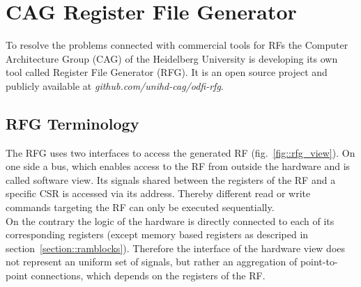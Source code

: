 \section{CAG Register File Generator}
To resolve the problems connected with commercial tools for RFs the Computer Architecture Group (CAG) of the Heidelberg University is developing its own tool called Register File Generator (RFG). It is an open source project and publicly available at \emph{github.com/unihd-cag/odfi-rfg}.

\subsection{RFG Terminology}

The RFG uses two interfaces to access the generated RF (fig.~\ref{fig::rfg_view}). On one side a bus, which enables access to the RF from outside the hardware and is called software view. Its signals shared between the registers of the RF and a specific CSR is accessed via its address. Thereby different read or write commands targeting the RF can only be executed sequentially.\\
On the contrary the logic of the hardware is directly connected to each of its corresponding registers (except memory based registers as descriped in section~\ref{section::ramblocks}). Therefore the interface of the hardware view does not represent an uniform set of signals, but rather an aggregation of point-to-point connections, which depends on the registers of the RF.

